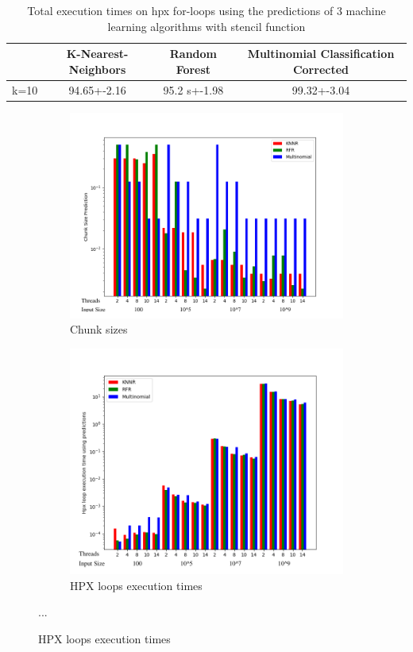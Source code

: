 \documentclass[12pt]{article}
\begin{document}
\begin{table}[h]
	\centering
	\caption{Total execution times on hpx for-loops using the predictions of 3 machine learning algorithms with stencil function}
	\label{my-label}
	\begin{tabular}{|c|c|c|c|}
		\hline
		& K-Nearest-Neighbors & Random Forest &Multinomial Classification Corrected\\ \hline
		k=10 & 94.65+-2.16  & 95.2 s+-1.98 & 99.32+-3.04\\ \hline
	\end{tabular}
\end{table}
\begin{figure}[h]
	\centering
	\begin{subfigure}[b]{0.5\textwidth}
		\centering
		\includegraphics[width=\textwidth]{images/stencil_predictions_bars.png}
		\caption[Network2]%
		{{Chunk sizes}}    
	\end{subfigure}
	\hfill
	\begin{subfigure}[b]{0.49\textwidth}  
		\centering 
		\includegraphics[width=\textwidth]{images/stencil_times_bars.png}
		\caption[]%
		{{HPX loops execution times}}    
	\end{subfigure}
	{...} 
	
\end{figure}
\end{document}
